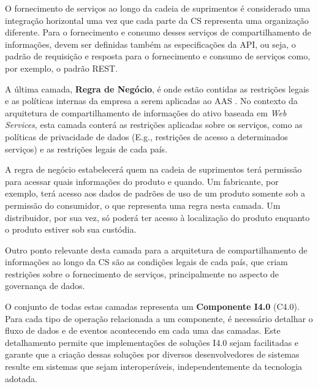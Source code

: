 	O fornecimento de serviços ao longo da cadeia de suprimentos é considerado uma integração horizontal uma vez que cada parte da CS representa uma organização diferente. Para o fornecimento e consumo desses serviços de compartilhamento de informações, devem ser definidas também as especificações da API, ou seja, o padrão de requisição e resposta para o fornecimento e consumo de serviços como, por exemplo, o padrão REST.
			
	A última camada, \textbf{Regra de Negócio}, é onde estão contidas as restrições legais e as políticas internas da empresa a serem aplicadas ao AAS \cite{adolphs2015rami}. No contexto da arquitetura de compartilhamento de informações do ativo baseada em \textit{Web Services}, esta camada conterá as restrições aplicadas sobre os serviços, como as políticas de privacidade de dados (E.g., restrições de acesso a determinados serviços) e as restrições legais de cada país.
	
	A regra de negócio estabelecerá quem na cadeia de suprimentos terá permissão para acessar quais informações do produto e quando. Um fabricante, por exemplo, terá acesso aos dados de padrões de uso de um produto somente sob a permissão do consumidor, o que representa uma regra nesta camada. Um distribuidor, por sua vez, só poderá ter acesso à localização do produto enquanto o produto estiver sob sua custódia.
	
	Outro ponto relevante desta camada para a arquitetura de compartilhamento de informações ao longo da CS são as condições legais de cada país, que criam restrições sobre o fornecimento de serviços, principalmente no aspecto de governança de dados.
	
	
	O conjunto de todas estas camadas representa um \textbf{Componente I4.0} (C4.0). Para cada tipo de operação relacionada a um componente, é necessário detalhar o fluxo de dados e de eventos acontecendo em cada uma das camadas. Este detalhamento permite que implementações de soluções I4.0 sejam facilitadas e garante que a criação dessas soluções por diversos desenvolvedores de sistemas resulte em sistemas que sejam interoperáveis, independentemente da tecnologia adotada.
	
